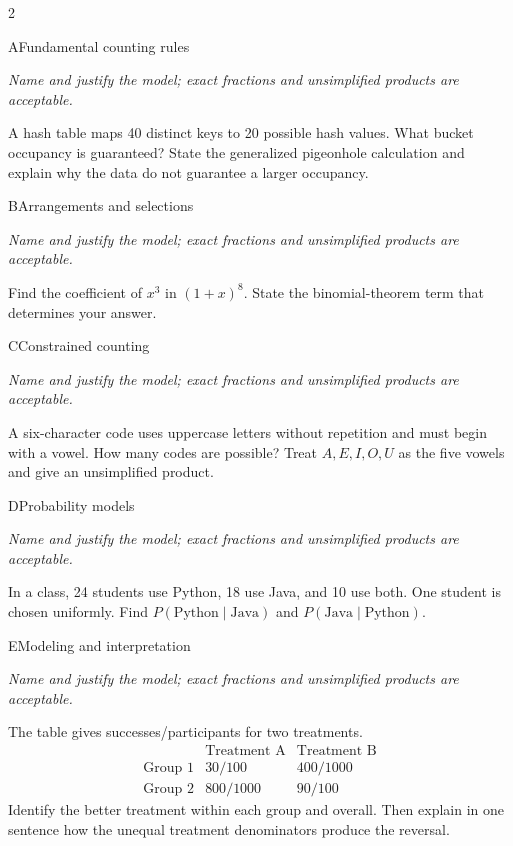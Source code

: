 \documentclass[9pt]{extarticle}
\begin{document}
\begin{multicols}{2}
\begin{CoreProblem}{A}{Fundamental counting rules}
{\scriptsize\textit{Name and justify the model; exact fractions and unsimplified products are acceptable.}\par}
A hash table maps 40 distinct keys to 20 possible hash values. What
    bucket occupancy is guaranteed? State the generalized pigeonhole calculation
    and explain why the data do not guarantee a larger occupancy.
\end{CoreProblem}
\begin{CoreProblem}{B}{Arrangements and selections}
{\scriptsize\textit{Name and justify the model; exact fractions and unsimplified products are acceptable.}\par}
Find the coefficient of $x^3$ in $(1+x)^8$. State the binomial-theorem
    term that determines your answer.
\end{CoreProblem}
\begin{CoreProblem}{C}{Constrained counting}
{\scriptsize\textit{Name and justify the model; exact fractions and unsimplified products are acceptable.}\par}
A six-character code uses uppercase letters without repetition and
    must begin with a vowel. How many codes are possible? Treat
    $A,E,I,O,U$ as the five vowels and give an unsimplified product.
\end{CoreProblem}
\columnbreak
\begin{CoreProblem}{D}{Probability models}
{\scriptsize\textit{Name and justify the model; exact fractions and unsimplified products are acceptable.}\par}
In a class, 24 students use Python, 18 use Java, and 10 use both.
    One student is chosen uniformly. Find
    $P(\text{Python}\mid\text{Java})$ and
    $P(\text{Java}\mid\text{Python})$.
\end{CoreProblem}
\begin{CoreProblem}{E}{Modeling and interpretation}
{\scriptsize\textit{Name and justify the model; exact fractions and unsimplified products are acceptable.}\par}
The table gives successes/participants for two treatments.
    \[
    \begin{array}{c|cc}
      &\text{Treatment A}&\text{Treatment B}\\\hline
      \text{Group 1}&30/100&400/1000\\
      \text{Group 2}&800/1000&90/100
    \end{array}
    \]
    Identify the better treatment within each group and overall. Then explain in
    one sentence how the unequal treatment denominators produce the reversal.
\end{CoreProblem}
\end{multicols}
\end{document}
